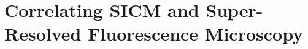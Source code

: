 \section{Correlating SICM and Super-Resolved Fluorescence Microscopy}
\label{sec:correlating-sicm-and-srfm}
